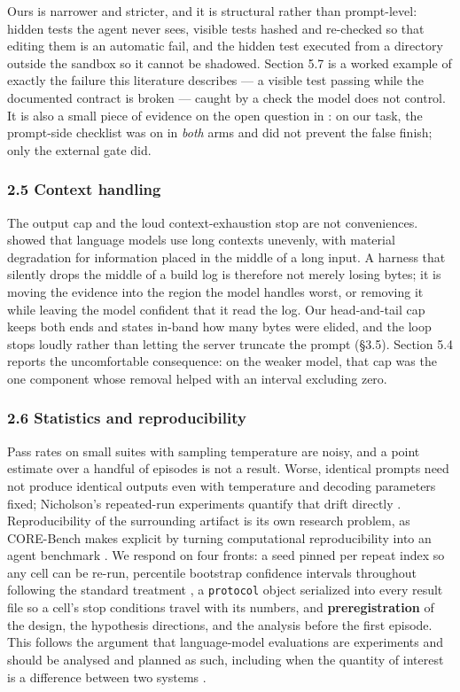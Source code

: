 \documentclass[
  10pt,
  a4paper,
]{article}
\let\oldtexttt\texttt
\renewcommand{\texttt}[1]{{\small\oldtexttt{#1}}}
\begin{document}
Ours is narrower and stricter, and it is structural rather than
prompt-level: hidden tests the agent never sees, visible tests hashed
and re-checked so that editing them is an automatic fail, and the hidden
test executed from a directory outside the sandbox so it cannot be
shadowed. Section 5.7 is a worked example of exactly the failure this
literature describes --- a visible test passing while the documented
contract is broken --- caught by a check the model does not control. It
is also a small piece of evidence on the open question in
\citet{kouremetis2026cheats}: on our task, the prompt-side checklist was
on in \emph{both} arms and did not prevent the false finish; only the
external gate did.

\subsubsection{2.5 Context handling}\label{context-handling}

The output cap and the loud context-exhaustion stop are not
conveniences. \citet{liu2024lost} showed that language models use long
contexts unevenly, with material degradation for information placed in
the middle of a long input. A harness that silently drops the middle of
a build log is therefore not merely losing bytes; it is moving the
evidence into the region the model handles worst, or removing it while
leaving the model confident that it read the log. Our head-and-tail cap
keeps both ends and states in-band how many bytes were elided, and the
loop stops loudly rather than letting the server truncate the prompt
(§3.5). Section 5.4 reports the uncomfortable consequence: on the weaker
model, that cap was the one component whose removal helped with an
interval excluding zero.

\subsubsection{2.6 Statistics and
reproducibility}\label{statistics-and-reproducibility}

Pass rates on small suites with sampling temperature are noisy, and a
point estimate over a handful of episodes is not a result. Worse,
identical prompts need not produce identical outputs even with
temperature and decoding parameters fixed; Nicholson's repeated-run
experiments quantify that drift directly \citep{nicholson2026drift}.
Reproducibility of the surrounding artifact is its own research problem,
as CORE-Bench makes explicit by turning computational reproducibility
into an agent benchmark \citep{siegel2024corebench}. We respond on four
fronts: a seed pinned per repeat index so any cell can be re-run,
percentile bootstrap confidence intervals throughout following the
standard treatment \citep{diciccio1996bootstrap}, a \texttt{protocol}
object serialized into every result file so a cell's stop conditions
travel with its numbers, and \textbf{preregistration} of the design, the
hypothesis directions, and the analysis before the first episode. This
follows the argument that language-model evaluations are experiments and
should be analysed and planned as such, including when the quantity of
interest is a difference between two systems
\citep{miller2024errorbars}.
\end{document}
